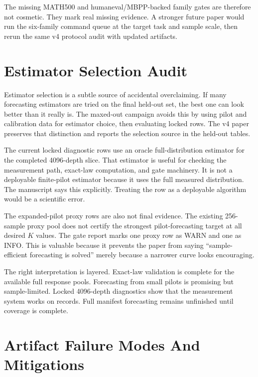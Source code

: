 The missing MATH500 and humaneval/MBPP-backed family gates are therefore not
cosmetic. They mark real missing evidence. A stronger future paper would run
the six-family command queue at the target task and sample scale, then rerun
the same v4 protocol audit with updated artifacts.

\section{Estimator Selection Audit}
\label{app:estimator-selection}

Estimator selection is a subtle source of accidental overclaiming. If many
forecasting estimators are tried on the final held-out set, the best one can
look better than it really is. The maxed-out campaign avoids this by using
pilot and calibration data for estimator choice, then evaluating locked rows.
The v4 paper preserves that distinction and reports the selection source in
the held-out tables.

The current locked diagnostic rows use an oracle full-distribution estimator
for the completed 4096-depth slice. That estimator is useful for checking the
measurement path, exact-law computation, and gate machinery. It is not a
deployable finite-pilot estimator because it uses the full measured
distribution. The manuscript says this explicitly. Treating the row as a
deployable algorithm would be a scientific error.

The expanded-pilot proxy rows are also not final evidence. The existing
256-sample proxy pool does not certify the strongest pilot-forecasting target
at all desired $K$ values. The gate report marks one proxy row as WARN and one
as INFO. This is valuable because it prevents the paper from saying
``sample-efficient forecasting is solved'' merely because a narrower curve
looks encouraging.

The right interpretation is layered. Exact-law validation is complete for the
available full response pools. Forecasting from small pilots is promising but
sample-limited. Locked 4096-depth diagnostics show that the measurement system
works on \EvidenceHeldoutRecords{} records. Full manifest forecasting remains
unfinished until coverage is complete.

\section{Artifact Failure Modes And Mitigations}
\label{app:artifact-failures}

